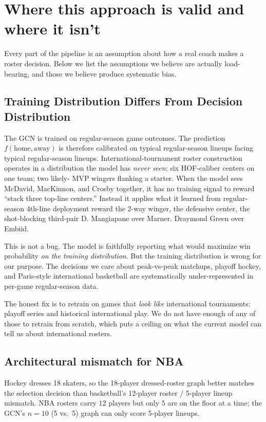 \documentclass[11pt,letterpaper]{article}
\begin{document}
\section{Where this approach is valid and where it isn't}
\label{sec:critique}

Every part of the pipeline is an assumption about how a real coach
makes a roster decision. Below we list the assumptions we believe are
actually load-bearing, and those we believe produce systematic bias.

\subsection{Training Distribution Differs From Decision Distribution}
\label{sec:chemistry}

The GCN is trained on regular-season game outcomes. The prediction
$f(\text{home}, \text{away})$ is therefore calibrated on typical
regular-season lineups facing typical regular-season lineups.
International-tournament roster construction operates in a distribution
the model has \emph{never seen}: six HOF-caliber centers on one team; two likely-
MVP wingers flanking a starter. When the model sees McDavid,
MacKinnon, and Crosby together, it has no training signal to reward
``stack three top-line centers.'' Instead it applies what it learned
from regular-season 4th-line deployment reward the 2-way winger, the
defensive center, the shot-blocking third-pair D. Mangiapane over
Marner. Draymond Green over Embiid.

This is not a bug. The model is faithfully reporting what would
maximize win probability \emph{on the training distribution}. But the
training distribution is wrong for our purpose. The decisions we care
about peak-vs-peak matchups, playoff hockey, and Paris-style
international basketball are systematically under-represented in per-game
regular-season data.

The honest fix is to retrain on games that \emph{look like}
international tournaments: playoff series and historical
international play.
We do not have enough of any of those to retrain from scratch, which
puts a ceiling on what the current model can tell us about
international rosters.

\subsection{Architectural mismatch for NBA}
\label{sec:arch-mismatch}

Hockey dresses 18 skaters, so the 18-player dressed-roster graph better
matches the selection decision than basketball's 12-player roster /
5-player lineup mismatch. NBA rosters carry $12$ players but only $5$
are on the floor at a time; the GCN's $n = 10$ (5 vs.\ 5) graph can
only score 5-player lineups.
\end{document}

